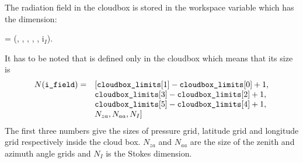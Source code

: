\vspace{1ex} The radiation field in the cloudbox is stored in the
workspace variable  which has the dimension:
\begin{center}
   =  (\Prs, \Lat, \Lon, \ScaZa,
  \ScaAa, i$_I$).
\end{center}
It has to be noted that  is defined only in the
cloudbox which means that its size is
\[ \begin{array}{rl}
 N(\texttt{i\_field}) =& [\texttt{cloudbox\_limits}[1] - \texttt{cloudbox\_limits}[0] + 1,\\
              &\texttt{cloudbox\_limits}[3] -\texttt{cloudbox\_limits}[2] + 1, \\
              &\texttt{cloudbox\_limits}[5] -\texttt{cloudbox\_limits}[4] + 1,  \\
              & N_{za}, N_{aa}, N_{I} ] 
\end{array}\]
The first three numbers give the sizes of pressure grid, latitude grid
and longitude grid respectively inside the cloud box. $N_{za}$ and
$N_{aa}$ are the size of the zenith and azimuth angle grids and
$N_{I}$ is the Stokes dimension.


